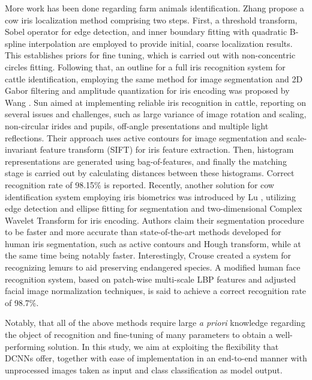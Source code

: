 \documentclass[10pt,twocolumn,letterpaper]{article}
\begin{document}
More work has been done regarding farm animals identification.  Zhang \etal \cite{ZhangIrisLocalizationCows2009} propose a cow iris localization method comprising two steps. First, a threshold transform, Sobel operator for edge detection, and inner boundary fitting with quadratic B-spline interpolation are employed to provide initial, coarse localization results. This establishes priors for fine tuning, which is carried out with non-concentric circles fitting. Following that, an outline for a full iris recognition system for cattle identification, employing the same method for image segmentation and 2D Gabor filtering and amplitude quantization for iris encoding was proposed by Wang \etal \cite{WangIrisLargeAnimals2009}. Sun \etal \cite{SunSIFTIrisCowsElsevier2013} aimed at implementing reliable iris recognition in cattle, reporting on several issues and challenges, such as large variance of image rotation and scaling, non-circular irides and pupils, off-angle presentations and multiple light reflections. Their approach uses active contours for image segmentation and scale-invariant feature transform (SIFT) for iris feature extraction. Then, histogram representations are generated using bag-of-features, and finally the matching stage is carried out by calculating distances between these histograms. Correct recognition rate of 98.15\% is reported. Recently, another solution for cow identification system employing iris biometrics was introduced by Lu \etal \cite{LuIrisCows2014}, utilizing edge detection and ellipse fitting for segmentation and two-dimensional Complex Wavelet Transform for iris encoding. Authors claim their segmentation procedure to be faster and more accurate than state-of-the-art methods developed for human iris segmentation, such as active contours and Hough transform, while at the same time being notably faster. 
Interestingly, Crouse \etal \cite{LemurRecognition2017} created a system for recognizing lemurs to aid preserving endangered species. A modified human face recognition system, based on patch-wise multi-scale LBP features and adjusted facial image normalization techniques, is said to achieve a correct recognition rate of 98.7\%.
 
 Notably, that all of the above methods require large \emph{a priori} knowledge regarding the object of recognition and fine-tuning of many parameters to obtain a well-performing solution. In this study, we aim at exploiting the flexibility that DCNNs offer, together with ease of implementation in an end-to-end manner with unprocessed images taken as input and class classification as model output.   
 
\end{document}
